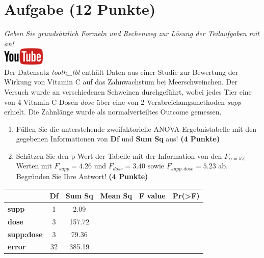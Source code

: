 \documentclass[a4paper, 9pt]{scrartcl}\usepackage[]{graphicx}\usepackage[]{xcolor}
\begin{document}
 
\clearpage

\section{Aufgabe \hfill (12 Punkte)}

\textit{Geben Sie grunds{\"a}tzlich Formeln und Rechenweg zur L{\"o}sung der
  Teilaufgaben mit an!} \\[1Ex]

\hfill\href{https://youtu.be/8Pb2sKUIMyk}{\includegraphics[width =
  2cm]{img/youtube}}\\[1Ex]



Der Datensatz \textit{tooth\_tbl} enth{\"a}lt Daten aus einer Studie zur
Bewertung der Wirkung von Vitamin C auf das Zahnwachstum bei
Meerschweinchen. Der Versuch wurde an verschiedenen Schweinen durchgef{\"u}hrt,
wobei jedes Tier eine von 4 Vitamin-C-Dosen \textit{dose}
{\"u}ber eine von 2 Verabreichungsmethoden \textit{supp}
erhielt. Die Zahnl{\"a}nge wurde als normalverteiltes Outcome gemessen.



\begin{enumerate}
\item F{\"u}llen Sie die unterstehende zweifaktorielle ANOVA Ergebnistabelle 
  mit den gegebenen Informationen von \textbf{Df} und \textbf{Sum Sq} aus!
  \textbf{(4 Punkte)}
\item Sch{\"a}tzen Sie den p-Wert der Tabelle mit der Information von den
  $F_{\alpha = 5\%}$-Werten mit
  $F_{supp} = 4.26$ und
  $F_{dose} = 3.40$ sowie
  $F_{supp:dose} = 5.23$ ab. Begr{\"u}nden Sie Ihre
  Antwort! \textbf{(4 Punkte)}
\end{enumerate}

\vspace{1Ex}

\begin{center}
  \Large
  \begin{tabular}{l|c|c|c|c|c}
     & \textbf{Df} & \textbf{Sum Sq} & \textbf{Mean Sq} & \textbf{F value} & \textbf{Pr(>F)} \strut\\
    \hline
   \textbf{supp}  & 1 & 2.09 &  &  &  \strut\\
    \hline
    \textbf{dose}  & 3 & 157.72 &  &  &  \strut\\
    \hline
    \textbf{supp:dose}  & 3 & 79.36 &  &  &  \strut\\
    \hline
   \textbf{error}  & 32 & 385.19 &  &  &  \strut\\
  \end{tabular}
\end{center}
\end{document}
